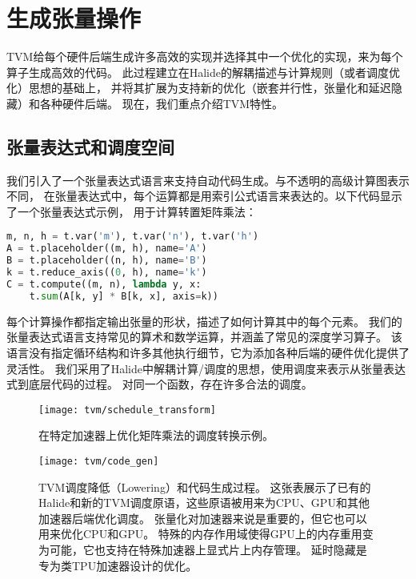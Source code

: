 \section{生成张量操作}
TVM给每个硬件后端生成许多高效的实现并选择其中一个优化的实现，来为每个算子生成高效的代码。
此过程建立在Halide的解耦描述与计算规则（或者调度优化）思想的基础上，
并将其扩展为支持新的优化（嵌套并行性，张量化和延迟隐藏）和各种硬件后端。
现在，我们重点介绍TVM特性。

\subsection{张量表达式和调度空间}
我们引入了一个张量表达式语言来支持自动代码生成。与不透明的高级计算图表示不同，
在张量表达式中，每个运算都是用索引公式语言来表达的。以下代码显示了一个张量表达式示例，
用于计算转置矩阵乘法：

\begin{lstlisting}[language={Python}]
m, n, h = t.var('m'), t.var('n'), t.var('h')
A = t.placeholder((m, h), name='A')
B = t.placeholder((n, h), name='B')
k = t.reduce_axis((0, h), name='k')
C = t.compute((m, n), lambda y, x:
    t.sum(A[k, y] * B[k, x], axis=k)) 
\end{lstlisting}

每个计算操作都指定输出张量的形状，描述了如何计算其中的每个元素。
我们的张量表达式语言支持常见的算术和数学运算，并涵盖了常见的深度学习算子。
该语言没有指定循环结构和许多其他执行细节，它为添加各种后端的硬件优化提供了灵活性。
我们采用了Halide中解耦计算/调度的思想，使用调度来表示从张量表达式到底层代码的过程。
对同一个函数，存在许多合法的调度。

\begin{figure}[htbp]
    \centering
    \texttt{[image: tvm/schedule\_transform]}
    \caption{\label{fig:schedule transform}在特定加速器上优化矩阵乘法的调度转换示例。}
\end{figure}

\begin{figure}[htbp]
    \centering
    \texttt{[image: tvm/code\_gen]}
    \caption{\label{fig:code gen}TVM调度降低（Lowering）和代码生成过程。
    这张表展示了已有的Halide和新的TVM调度原语，这些原语被用来为CPU、GPU和其他加速器后端优化调度。
    张量化对加速器来说是重要的，但它也可以用来优化CPU和GPU。
    特殊的内存作用域使得GPU上的内存重用变为可能，它也支持在特殊加速器上显式片上内存管理。
    延时隐藏是专为类TPU加速器设计的优化。}
\end{figure}

